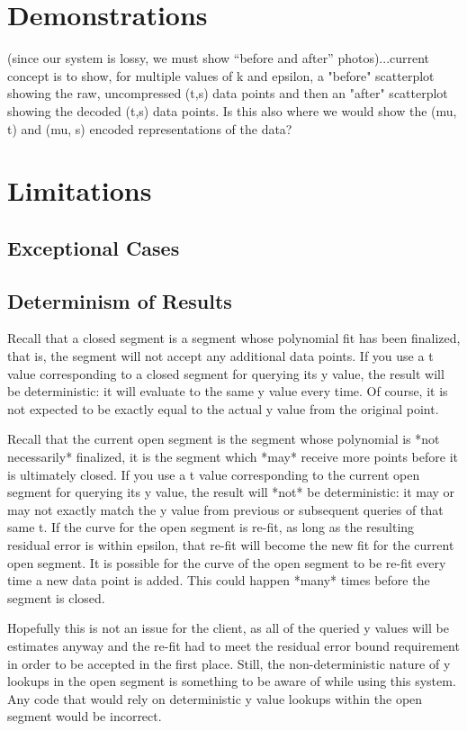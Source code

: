 \documentclass{article}
\begin{document}
\section{Demonstrations}
(since our system is lossy, we must show “before and after” photos)...current concept is to show, for multiple values of k and epsilon, a "before" scatterplot showing the raw, uncompressed (t,s) data points and then an "after" scatterplot showing the decoded (t,s) data points. Is this also where we would show the (mu, t) and (mu, s) encoded representations of the data?

\section{Limitations}

\subsection{Exceptional Cases}

\subsection{Determinism of Results}
Recall that a closed segment is a segment whose polynomial fit has been finalized, that is, the segment will not accept any additional data points. If you use a t value corresponding to a closed segment for querying its y value, the result will be deterministic: it will evaluate to the same y value every time. Of course, it is not expected to be exactly equal to the actual y value from the original point.

Recall that the current open segment is the segment whose polynomial is *not necessarily* finalized, it is the segment which *may* receive more points before it is ultimately closed. If you use a t value corresponding to the current open segment for querying its y value, the result will *not* be deterministic: it may or may not exactly match the y value from previous or subsequent queries of that same t.
If the curve for the open segment is re-fit, as long as the resulting residual error is within epsilon, that re-fit will become the new fit for the current open segment. It is possible for the curve of the open segment to be re-fit every time a new data point is added. This could happen *many* times before the segment is closed.

Hopefully this is not an issue for the client, as all of the queried y values will be estimates anyway and the re-fit had to meet the residual error bound requirement in order to be accepted in the first place. Still, the non-deterministic nature of y lookups in the open segment is something to be aware of while using this system. Any code that would rely on deterministic y value lookups within the open segment would be incorrect.
\end{document}
